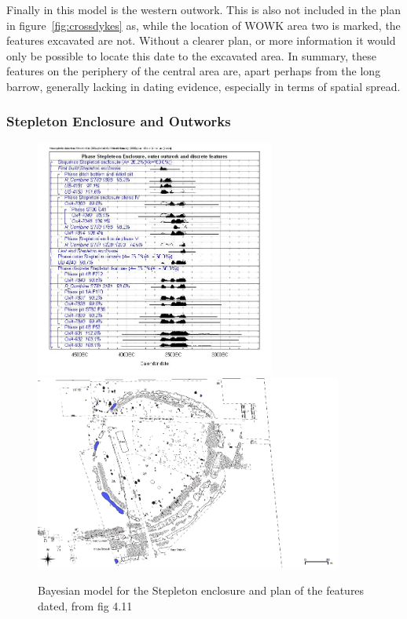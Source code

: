 Finally in this model is the western outwork. This is also not included in the plan in figure~\ref{fig:crossdykes} as, while the location of WOWK area two is marked, the features excavated are not. Without a clearer plan, or more information it would only be possible to locate this date to the excavated area. In summary, these features on the periphery of the central area are, apart perhaps from the long barrow, generally lacking in dating evidence, especially in terms of  spatial spread. 

\subsubsection{Stepleton Enclosure and Outworks}

\begin{figure}
\centering
	\includegraphics[width=0.7\textwidth]{figures/model4}
	\includegraphics[width=0.9\textwidth]{figures/model4-plan}
  \caption{Bayesian model for the Stepleton enclosure and plan of the features dated, from fig 4.11 \citep[142]{Whittle:2011kl}}
  \label{fig:stepleton}
\end{figure}

